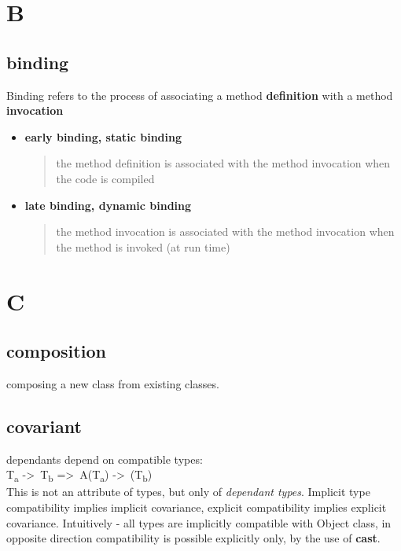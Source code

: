 \documentclass{report}
\begin{document}
\section{B}

\subsection{binding}
Binding refers to the process of associating a method \textbf{definition} with a method \textbf{invocation}
\begin{itemize}
	\item \textbf{early binding, static binding}
	 \begin{quote}
	 	the method definition is associated with the method invocation when the code is compiled
	 \end{quote}
	 \item \textbf{late binding, dynamic binding}
	 \begin{quote}
	 	the method invocation is associated with the method invocation when the method is invoked (at run time)
	 \end{quote}
\end{itemize}


\section{C}

\subsection{composition}
composing a new class from existing classes.

\subsection{covariant}
dependants depend on compatible types:\\
T\textsubscript{a} -\textgreater\  T\textsubscript{b} =\textgreater\ A(T\textsubscript{a}) -\textgreater\  (T\textsubscript{b})\\

This is not an attribute of types, but only of \textit{dependant types}.
Implicit type compatibility implies implicit covariance, explicit compatibility implies explicit covariance. Intuitively - all types are implicitly compatible with Object class,
in opposite direction compatibility is possible explicitly only, by the use of \textbf{cast}.
\end{document}

